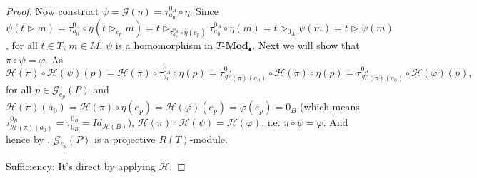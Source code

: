 \documentclass[11pt, twoside]{article}
\begin{document}
\begin{proof}
Now construct $\psi = \mathcal{G}(\eta) = \tau_{a_0}^{0_A} \circ \eta$. Since $\psi(t\rhd m) = \tau_{a_0}^{0_A} \circ \eta(t\rhd_{e_p} m) = t\rhd_{\tau_{a_0}^{0_A} \circ \eta(e_p)} \tau_{a_0}^{0_A} \circ \eta(m) = t\rhd_{0_A} \psi(m) = t\rhd \psi(m) $, for all $t\in T$, $m\in M$, $\psi$ is a homomorphism in $T\textbf{-Mod}_{\bullet}$. Next we will show that $\pi \circ \psi = \varphi $. As
$$ \mathcal{H}(\pi) \circ \mathcal{H}(\psi) (p) = \mathcal{H}(\pi) \circ \tau_{a_0}^{0_A} \circ \eta(p) = \tau_{\mathcal{H}(\pi)(a_0)}^{0_B} \circ \mathcal{H}(\pi) \circ \eta(p) = \tau_{\mathcal{H}(\pi)(a_0)}^{0_B} \circ \mathcal{H}(\varphi)(p),$$
for all $p \in \mathcal{G}_{e_p}(P)$ and $\mathcal{H}(\pi)(a_0) = \mathcal{H}(\pi) \circ \eta(e_p) = \mathcal{H}(\varphi)(e_p) = \varphi(e_p) = 0_B$ (which means $\tau_{\mathcal{H}(\pi)(a_0)}^{0_B} = \tau_{0_B}^{0_B} = Id_{\mathcal{H}(B)}$), $\mathcal{H}(\pi) \circ \mathcal{H}(\psi) = \mathcal{H}(\varphi)$, i.e. $\pi \circ \psi = \varphi$. And hence by \cite[Theorem 3.1]{mb}, $\mathcal{G}_{e_p}(P)$ is a projective $R(T)$-module.

Sufficiency: It's direct by applying $\mathcal{H}$.
\end{proof}
\end{document}
